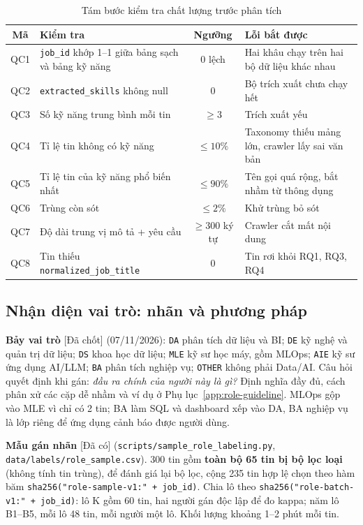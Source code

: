 \documentclass[12pt]{article}
\newcommand{\code}[1]{\texttt{#1}}
\newcommand{\dacoi}{\textsf{[Đã có]}}
\newcommand{\dachot}{\textsf{[Đã chốt]}}
\begin{document}
\begin{table}[htbp]
\centering
\caption{Tám bước kiểm tra chất lượng trước phân tích}
\label{tab:qc}
\renewcommand{\arraystretch}{1.12}
\begin{tabularx}{\textwidth}{c X c X}
\toprule
\textbf{Mã} & \textbf{Kiểm tra} & \textbf{Ngưỡng} & \textbf{Lỗi bắt được} \\
\midrule
QC1 & \code{job\_id} khớp 1--1 giữa bảng sạch và bảng kỹ năng & 0 lệch & Hai khâu chạy trên hai bộ dữ liệu khác nhau \\
QC2 & \code{extracted\_skills} không null & 0 & Bộ trích xuất chưa chạy hết \\
QC3 & Số kỹ năng trung bình mỗi tin & $\ge 3$ & Trích xuất yếu \\
QC4 & Tỉ lệ tin không có kỹ năng & $\le 10\%$ & Taxonomy thiếu mảng lớn, crawler lấy sai văn bản \\
QC5 & Tỉ lệ tin của kỹ năng phổ biến nhất & $\le 90\%$ & Tên gọi quá rộng, bắt nhầm từ thông dụng \\
QC6 & Trùng còn sót & $\le 2\%$ & Khử trùng bỏ sót \\
QC7 & Độ dài trung vị mô tả + yêu cầu & $\ge 300$ ký tự & Crawler cắt mất nội dung \\
QC8 & Tin thiếu \code{normalized\_job\_title} & 0 & Tin rơi khỏi RQ1, RQ3, RQ4 \\
\bottomrule
\end{tabularx}
\end{table}

\subsection{Nhận diện vai trò: nhãn và phương pháp}
\label{sec:roles}

\textbf{Bảy vai trò} \dachot{} (07/11/2026): \code{DA} phân tích dữ liệu và BI; \code{DE} kỹ nghệ và quản trị dữ liệu; \code{DS} khoa học dữ liệu; \code{MLE} kỹ sư học máy, gồm MLOps; \code{AIE} kỹ sư ứng dụng AI/LLM; \code{BA} phân tích nghiệp vụ; \code{OTHER} không phải Data/AI. Câu hỏi quyết định khi gán: \textit{đầu ra chính của người này là gì?} Định nghĩa đầy đủ, cách phân xử các cặp dễ nhầm và ví dụ ở Phụ lục~\ref{app:role-guideline}. MLOps gộp vào MLE vì chỉ có 2 tin; BA làm SQL và dashboard xếp vào DA, BA nghiệp vụ là lớp riêng để ứng dụng cảnh báo được người dùng.

\textbf{Mẫu gán nhãn} \dacoi{} (\code{scripts/sample\_role\_labeling.py}, \code{data/labels/role\_sample.csv}). 300 tin gồm \textbf{toàn bộ 65 tin bị bộ lọc loại} (không tính tin trùng), để đánh giá lại bộ lọc, cộng 235 tin hợp lệ chọn theo hàm băm \code{sha256("role-sample-v1:" + job\_id)}. Chia lô theo \code{sha256("role-batch-v1:" + job\_id)}: lô K gồm 60 tin, hai người gán độc lập để đo kappa; năm lô B1--B5, mỗi lô 48 tin, mỗi người một lô. Khối lượng khoảng 1--2 phút mỗi tin.
\end{document}
